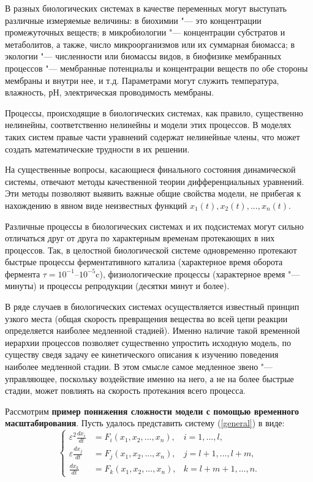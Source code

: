 \documentclass[12pt,a4paper,oneside]{book}
\begin{document}
В разных биологических системах в качестве переменных могут выступать различные измеряемые величины: в биохимии "--- это концентрации промежуточных веществ; в микробиологии "--- концентрации субстратов и метаболитов, а также, число микроорганизмов или их суммарная биомасса; в экологии "--- численности или биомассы видов, в биофизике мембранных процессов "--- мембранные потенциалы и концентрации веществ по обе стороны мембраны и внутри нее, и т.д. Параметрами могут служить температура, влажность, рН, электрическая проводимость мембраны.

Процессы, происходящие в биологических системах, как правило, существенно нелинейны, соответственно нелинейны и модели этих процессов. В моделях таких систем правые части уравнений содержат нелинейные члены, что может создать математические трудности в их решении.

На существенные вопросы, касающиеся финального состояния динамической системы, отвечают методы качественной теории дифференциальных уравнений. Эти методы позволяют выявить важные общие свойства модели, не прибегая к нахождению в явном виде неизвестных функций $x_1(t), x_2(t), ..., x_n(t)$.

Различные процессы в биологических системах и их подсистемах могут сильно отличаться друг от друга по характерным временам протекающих в них процессов. Так, в целостной биологической системе одновременно протекают быстрые процессы ферментативного катализа (характерное время оборота фермента $\tau = 10^{-1}$--$10^{-5}$c), физиологические процессы (характерное время "--- минуты) и процессы репродукции (десятки минут и более).

В ряде случаев в биологических системах осуществляется известный принцип узкого места (общая скорость превращения вещества во всей цепи реакции определяется наиболее медленной стадией). Именно наличие такой временной иерархии процессов позволяет существенно упростить исходную модель, по существу сведя задачу ее кинетического описания к изучению поведения наиболее медленной стадии. В этом смысле самое медленное звено "--- управляющее, поскольку воздействие именно на него, а не на более быстрые стадии, может повлиять на скорость протекания всего процесса.

Рассмотрим {\bf пример понижения сложности модели с помощью временного масштабирования}. Пусть удалось представить систему (\ref{general}) в виде:
\begin{equation}
	\label{sepSystem}
 \left\lbrace 
	\begin{aligned}
		\varepsilon ^2 \frac{dx_i}{dt} &= F_i(x_1, x_2, ..., x_n), & i=1, ..., l,\\
		\varepsilon \frac{dx_j}{dt} &= F_j(x_1, x_2, ..., x_n), & j=l+1, ..., l+m,\\
		\frac{dx_k}{dt} &= F_k(x_1, x_2, ..., x_n), & k=l+m+1, ..., n.
	\end{aligned}
 \right.
\end{equation}
\end{document}
